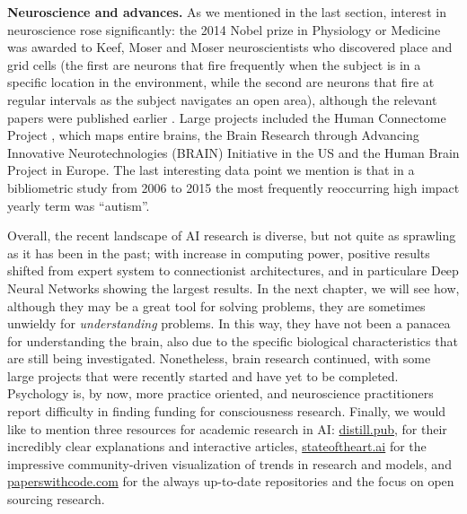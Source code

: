 \documentclass[../main.tex]{subfiles}
\begin{document}
\vspace{4pt}
\textbf{Neuroscience and advances.} As we mentioned in the last section, interest in neuroscience rose significantly: the 2014 Nobel prize in Physiology or Medicine was awarded to Keef, Moser and Moser neuroscientists who discovered place and grid cells (the first are neurons that fire frequently when the subject is in a specific location in the environment, while the second are neurons that fire at regular intervals as the subject navigates an open area), although the relevant papers were published earlier \parencite{okeefeDualPhaseRate2005} \parencite{moserPlaceCellsGrid2008}. Large projects included the Human Connectome Project \parencite{ltdNews2010}, which maps entire brains, the Brain Research through Advancing Innovative Neurotechnologies (BRAIN) Initiative \parencite{NIHBRAINInitiative2013} in the US and the Human Brain Project \parencite{CountdownDigitalSimulation2012} in Europe. The last interesting data point we mention is that in a bibliometric study from 2006 to 2015 \parencite{yeungChangingLandscapeNeuroscience2017} the most frequently reoccurring high impact yearly term was ``autism''.


\vspace{5pt}
Overall, the recent landscape of AI research is diverse, but not quite as sprawling as it has been in the past; with increase in computing power, positive results shifted from expert system to connectionist architectures, and in particulare Deep Neural Networks showing the largest results. In the next chapter, we will see how, although they may be a great tool for solving problems, they are sometimes unwieldy for \textit{understanding} problems. In this way, they have not been a panacea for understanding the brain, also due to the specific biological characteristics that are still being investigated. Nonetheless, brain research continued, with some large projects that were recently started and have yet to be completed. Psychology is, by now, more practice oriented, and neuroscience practitioners report difficulty in finding funding for consciousness research. Finally, we would like to mention three resources for academic research in AI: \href{https://distill.pub}{distill.pub}, for their incredibly clear explanations and interactive articles, \href{https://www.stateoftheart.ai}{stateoftheart.ai} for the impressive community-driven visualization of trends in research and models, and \href{https://paperswithcode.com/}{paperswithcode.com} for the always up-to-date repositories and the focus on open sourcing research.
\end{document}
